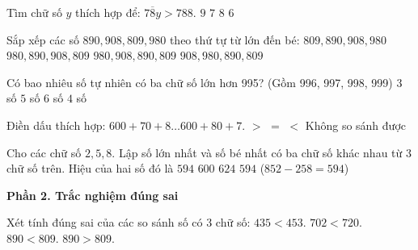 \begin{ex} %
Tìm chữ số $y$ thích hợp để: $\overline{78y} > 788$.
\choice
{\True $9$}
{$7$}
{$8$}
{$6$}
\end{ex}

\begin{ex} %
Sắp xếp các số $890, 908, 809, 980$ theo thứ tự từ lớn đến bé:
\choice
{$809, 890, 908, 980$}
{$980, 890, 908, 809$}
{\True $980, 908, 890, 809$}
{$908, 980, 890, 809$}
\end{ex}

\begin{ex} %
Có bao nhiêu số tự nhiên có ba chữ số lớn hơn 995? (Gồm 996, 997, 998, 999)
\choice
{$3$ số}
{$5$ số}
{$6$ số}
{\True $4$ số}
\end{ex}

\begin{ex} %
Điền dấu thích hợp: $600 + 70 + 8 \dots 600 + 80 + 7$.
\choice
{$>$}
{$=$}
{\True $<$}
{Không so sánh được}
\end{ex}

\begin{ex} %
Cho các chữ số $2, 5, 8$. Lập số lớn nhất và số bé nhất có ba chữ số khác nhau từ 3 chữ số trên. Hiệu của hai số đó là
\choice
{$594$}
{$600$}
{$624$}
{\True $594$ ($852 - 258 = 594$)}
\end{ex}

\textbf{Phần 2. Trắc nghiệm đúng sai}

\begin{ex} %
Xét tính đúng sai của các so sánh số có 3 chữ số:
\choiceTF
{\True $435 < 453$.}
{\True $702 < 720$.}
{$890 < 809$.}
{\True $890 > 809$.}
\end{ex}

